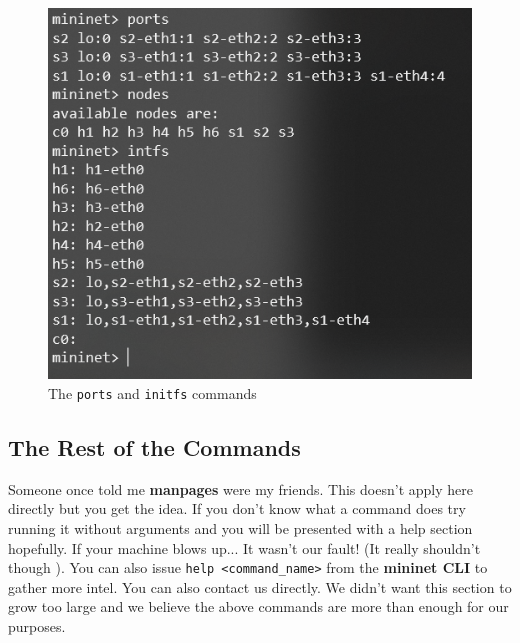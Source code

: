 \documentclass[12pt]{article}
\begin{document}
        \newpage
		\begin{figure}[!htb]
			\centering
			\includegraphics[width=\linewidth]{initfs_cmd.png}
			\caption{The \texttt{ports} and \texttt{initfs} commands}
			\label{f:initfs}
		\end{figure}

	\subsection{The Rest of the Commands}
		Someone once told me \textbf{manpages} were my friends. This doesn't apply here directly but you get the idea. If you don't know what a command does try running it without arguments and you will be presented with a help section hopefully. If your machine blows up... It wasn't our fault! (It really shouldn't though  ). You can also issue \texttt{help <command\_name>} from the \textbf{mininet CLI} to gather more intel. You can also contact us directly. We didn't want this section to grow too large and we believe the above commands are more than enough for our purposes.
\end{document}
